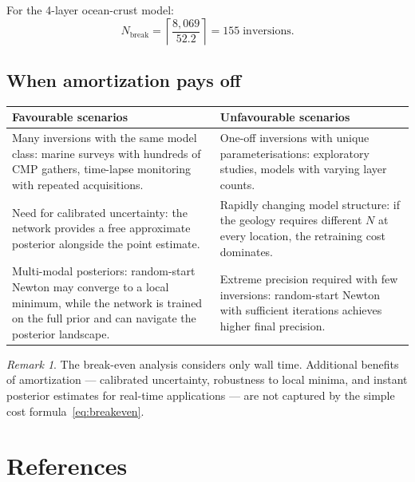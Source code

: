 \documentclass[11pt,a4paper]{article}
\theoremstyle{plain}
\theoremstyle{remark}
\newtheorem{remark}{Remark}
\begin{document}
\noindent For the 4-layer ocean-crust model:
\begin{equation}\label{eq:breakeven-value}
  N_{\text{break}}
  = \left\lceil \frac{8{,}069}{52.2} \right\rceil
  = 155\;\text{inversions}.
\end{equation}

\subsection{When amortization pays off}

\begin{center}
\renewcommand{\arraystretch}{1.3}
\begin{tabular}{p{6cm}p{6cm}}
  \toprule
  \textbf{Favourable scenarios} & \textbf{Unfavourable scenarios} \\
  \midrule
  Many inversions with the same model class: marine surveys with
  hundreds of CMP gathers, time-lapse monitoring with repeated
  acquisitions.
  &
  One-off inversions with unique parameterisations: exploratory
  studies, models with varying layer counts. \\[6pt]
  Need for calibrated uncertainty: the network provides a free
  approximate posterior alongside the point estimate.
  &
  Rapidly changing model structure: if the geology requires
  different $N$ at every location, the retraining cost dominates. \\[6pt]
  Multi-modal posteriors: random-start Newton may converge to a
  local minimum, while the network is trained on the full prior
  and can navigate the posterior landscape.
  &
  Extreme precision required with few inversions: random-start
  Newton with sufficient iterations achieves higher final
  precision. \\
  \bottomrule
\end{tabular}
\end{center}

\begin{remark}
The break-even analysis considers only wall time.  Additional benefits
of amortization --- calibrated uncertainty, robustness to local minima,
and instant posterior estimates for real-time applications --- are not
captured by the simple cost formula~\eqref{eq:breakeven}.
\end{remark}

\section*{References}
\end{document}

